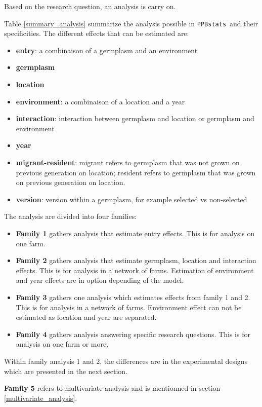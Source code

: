 \documentclass{article}\usepackage[]{graphicx}\usepackage[]{color}
\newcommand{\pack}{\texttt{PPBstats}}
\begin{document}
Based on the research question, an analysis is carry on.

Table \ref{summary_analysis} summarize the analysis possible in \pack~and their specificities.
The different effects that can be estimated are:
\begin{itemize}
\item \textbf{entry}: a combinaison of a germplasm and an environment
\item \textbf{germplasm}
\item \textbf{location} 
\item \textbf{environment}: a combinaison of a location and a year
\item \textbf{interaction}: interaction between germplasm and location or germplasm and environment
\item \textbf{year}
\item \textbf{migrant-resident}: migrant refers to germplasm that was not grown on previous generation on location; resident refers to germplasm that was grown  on previous generation on location.
\item \textbf{version}: version within a germplasm, for example selected vs non-selected
\end{itemize}

\noindent The analysis are divided into four families:
\begin{itemize}
\item \textbf{Family 1} gathers analysis that estimate entry effects. This is for analysis on one farm.
\item \textbf{Family 2} gathers analysis that estimate germplasm, location and interaction effects. This is for analysis in a network of farms. Estimation of environment and year effects are in option depending of the model.
\item \textbf{Family 3} gathers one analysis which estimates effects from family 1 and 2. This is for analysis in a network of farms. Environment effect can not be estimated as location and year are separated.
\item \textbf{Family 4} gathers analysis answering specific research questions. This is for analysis on one farm or more.
\end{itemize}
Within family analysis 1 and 2, the differences are in the experimental designs which are presented in the next section.

\textbf{Family 5} refers to multivariate analysis and is mentionned in section \ref{multivariate_analysis}.
\end{document}
